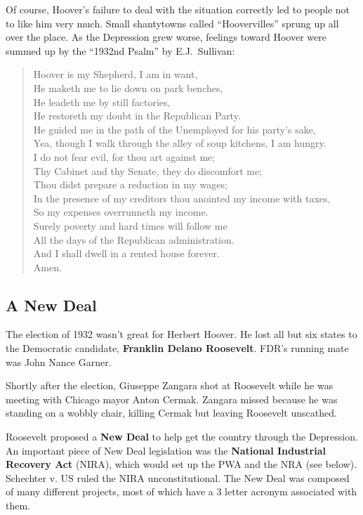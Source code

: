 Of course, Hoover's failure to deal with the situation correctly led to people not to like him very much.
Small shantytowns called ``Hoovervilles'' sprung up all over the place.
As the Depression grew worse, feelings toward Hoover were summed up by the ``1932nd Psalm'' by E.J.\ Sullivan:
\begin{quote}
  Hoover is my Shepherd, I am in want, \\
  He maketh me to lie down on park benches, \\
  He leadeth me by still factories, \\
  He restoreth my doubt in the Republican Party. \\
  He guided me in the path of the Unemployed for his party's sake, \\
  Yea, though I walk through the alley of soup kitchens, I am hungry. \\
  I do not fear evil, for thou art against me; \\
  Thy Cabinet and thy Senate, they do discomfort me; \\
  Thou didst prepare a reduction in my wages; \\
  In the presence of my creditors thou anointed my income with taxes, \\
  So my expenses overrunneth my income. \\
  Surely poverty and hard times will follow me \\
  All the days of the Republican administration. \\
  And I shall dwell in a rented house forever. \\
  Amen.
\end{quote}

\subsection*{A New Deal}

The election of 1932 wasn't great for Herbert Hoover.
He lost all but six states to the Democratic candidate, \textbf{Franklin Delano Roosevelt}.
FDR's running mate was John Nance Garner.

Shortly after the election, Giuseppe Zangara shot at Roosevelt while he was meeting with Chicago mayor Anton Cermak.
Zangara missed because he was standing on a wobbly chair, killing Cermak but leaving Roosevelt unscathed.

Roosevelt proposed a \textbf{New Deal} to help get the country through the Depression.
An important piece of New Deal legislation was the \textbf{National Industrial Recovery Act} (NIRA),
which would set up the PWA and the NRA (see below).
Schechter v. US ruled the NIRA unconstitutional.
The New Deal was composed of many different projects, most of which have a 3 letter acronym associated with them.

